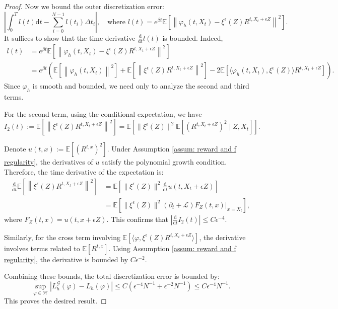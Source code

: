 \documentclass[twoside,11pt]{article}
\newcommand{\dd}{\mathrm{d}}
\newcommand{\E}{\mathbb{E}}
\newcommand{\cH}{\mathcal{H}}
\newcommand{\1}{\mathbf{1}}
\numberwithin{equation}{section}
\begin{document}
\begin{proof}
Now we bound the outer discretization error:
\begin{equation}
    \left| \int_0^T l(t) \dd t - \sum_{i=0}^{N-1} l(t_i) \Delta t_i \right|, \quad \text{where } l(t) = e^{\beta t} \E \left[ \left\| \varphi_h(t, X_t) - \xi^\epsilon(Z)R^{t,X_t + \epsilon Z} \right\|^2 \right].
\end{equation}
It suffices to show that the time derivative $\frac{\dd}{\dd t} l(t)$ is bounded. Indeed,
\begin{equation}
\begin{aligned}
    l(t) &= e^{\beta t}\E \left[ \left\| \varphi_h(t, X_t) - \xi^\epsilon(Z)R^{t,X_t + \epsilon Z} \right\|^2 \right] \\
    &= e^{\beta t}\left(\E\left[ \left\|\varphi_h(t,X_t)\right\|^2\right] + \E \left[ \left\| \xi^{\epsilon}(Z) R^{t, X_t+\epsilon Z} \right\|^2 \right] - 2\E\left[ \langle \varphi_h(t,X_t), \xi^{\epsilon}(Z) \rangle R^{t,X_t + \epsilon Z}\right]\right).
    \end{aligned}
\end{equation}
Since $ \varphi_h$ is smooth and bounded, we need only to analyze the second and third terms.

For the second term, using the conditional expectation, we have
\begin{equation}
    I_2(t):=\E\left[ \left\| \xi^{\epsilon}(Z) R^{t, X_t+\epsilon Z} \right\|^2\right] = \E\left[ \|\xi^{\epsilon}(Z)\|^2 \E\left[ (R^{t,X_t + \epsilon Z})^2\mid Z,X_t\right]\right].
\end{equation}

Denote $u(t, x) := \E [ (R^{t,x})^2 ]$.
Under Assumption \ref{assum: reward and f regularity}, the  derivatives of $ u$ satisfy the polynomial growth condition.
Therefore, the time derivative of the expectation is:
\begin{equation}
\begin{aligned}
    \frac{\dd}{\dd t}\E\left[ \left\| \xi^{\epsilon}(Z) R^{t, X_t+\epsilon Z} \right\|^2\right]& =   \E[\|\xi^{\epsilon}(Z)\|^2 \frac{\dd}{\dd t}u(t, X_t + \epsilon Z)] \\
    &= \E \left[ \|\xi^{\epsilon}(Z)\|^2(\partial_t + \mathcal{L}) F_Z(t,x)\big|_{x = X_t} \right],
    \end{aligned}
\end{equation}
where $ F_Z(t,x) = u(t,x + \epsilon Z)$.
This confirms that $|\frac{\dd}{\dd t} I_2(t)| \le C \epsilon^{-4}$.

Similarly, for the cross term involving $\E [ \langle \varphi, \xi^\epsilon(Z)R^{t,X_t+\epsilon Z} \rangle ]$, the derivative involves terms related to $\E[R^{t,x}]$. Using Assumption \ref{assum: reward and f regularity}, the derivative is bounded by $C \epsilon^{-2}$.


Combining these bounds, the total discretization error is bounded by:
\begin{equation}
    \sup_{\varphi \in \cH} \left| L_h^{\mathcal{G}}(\varphi) - L_h(\varphi) \right| \le C \left( \epsilon^{-4} N^{-1} + \epsilon^{-2} N^{-1} \right) \le C \epsilon^{-4} N^{-1}.
\end{equation}
This proves the desired result.
\end{proof}
\end{document}
